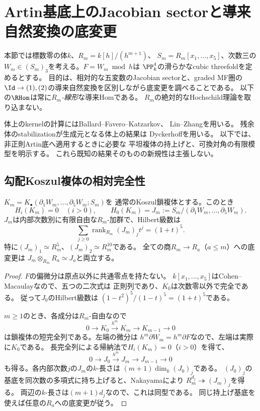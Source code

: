 \section{Artin基底上のJacobian sectorと導来自然変換の底変更}
\label{ras:sec:artin-sector}

本節では標数零の体$k$、$R_m=k[h]/(h^{m+1})$、
$S_m=R_m[x_1,\ldots,x_5]$、次数三の
$W_m\in(S_m)_3$を考える。$F=W_m\bmod h$は
$\PP^4_k$の滑らかなcubic threefoldを定めるとする。
目的は、相対的な五変数のJacobian sectorと、graded MF圏の
$\Id\to(1),(2)$の導来自然変換を区別しながら底変更を調べることである。
以下の$\RHom$は常に\emph{$R_m$-線形}な導来Homである。
$R_m$の絶対的なHochschild理論を取り込まない。

体上のkernelの計算にはBallard--Favero--Katzarkov\cite{RASBFK}、
Lin--Zhang\cite[Theorem~3.5, Remark~3.6]{RASLZ}を用いる。
残余体のstabilizationが生成元となる体上の結果は
Dyckerhoff\cite{RASDyck}を用いる。
以下では、非正則Artin底へ適用するときに必要な
平坦複体の持上げと、可換対角の有限模型を明示する。
これら既知の結果そのものの新規性は主張しない。

\subsection{勾配Koszul複体の相対完全性}

\begin{lemma}[勾配の全Artin完全性]\label{ras:lem:gradient}
$K_m=K_\bullet(\partial_1W_m,\ldots,\partial_5W_m;S_m)$を
通常のKoszul鎖複体とする。このとき
\[
 H_i(K_m)=0\quad(i>0),\qquad
 H_0(K_m)=J_m:=S_m/(\partial_1W_m,\ldots,\partial_5W_m).
\]
$J_m$は内部次数別に有限自由な$R_m$-加群で、Hilbert級数は
\[
 \sum_{j\ge0}\operatorname{rank}_{R_m}(J_m)_jt^j=(1+t)^5.
 \tag{RAS1}\label{ras:eq:hilbert}
\]
特に$(J_m)_1\simeq R_m^5$、$(J_m)_2\simeq R_m^{10}$である。
全ての商$R_m\to R_a$（$a\le m$）への底変更は
$J_m\otimes_{R_m}R_a\simeq J_a$と両立する。
\end{lemma}
\begin{proof}
$F$の偏微分は原点以外に共通零点を持たない。
$k[x_1,\ldots,x_5]$はCohen--Macaulayなので、五つの二次式は
正則列であり、$K_0$は次数零以外で完全である。
従って$J_0$のHilbert級数は
$(1-t^2)^5/(1-t)^5=(1+t)^5$である。

$m\ge1$のとき、各成分は$R_m$-自由なので
\[
 0\longrightarrow K_0\xrightarrow{h^m}K_m
 \longrightarrow K_{m-1}\longrightarrow0
 \tag{RAS2}\label{ras:eq:short}
\]
は鎖複体の短完全列である。左端の微分は
$h^m\partial W_m=h^m\partial F$なので、左端は実際に$K_0$である。
長完全列による帰納法で$H_i(K_m)=0$（$i>0$）を得て、
\[
 0\longrightarrow J_0\xrightarrow{h^m}J_m
 \longrightarrow J_{m-1}\longrightarrow0
\]
も得る。各内部次数$j$の$J_m$の$k$-長さは
$(m+1)\dim_k(J_0)_j$である。
$(J_0)_j$の基底を同次数の多項式に持ち上げると、Nakayamaにより
$R_m^{d_j}\twoheadrightarrow(J_m)_j$を得る。
両辺の$k$-長さは$(m+1)d_j$なので、これは同型である。
同じ持上げ基底を使えば任意の$R_a$への底変更が従う。
\end{proof}

